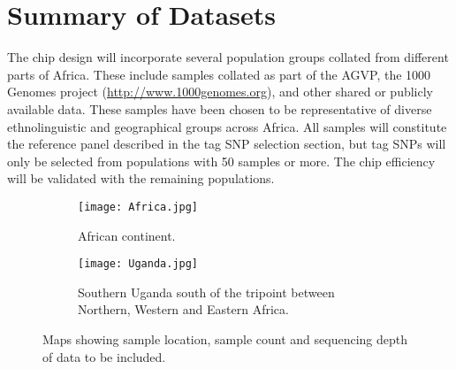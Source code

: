 \section{Summary of Datasets}
The chip design will incorporate several population groups collated from different parts of Africa. These include samples collated as part of the AGVP\cite{Gurdasani2015}, the 1000 Genomes project (\href{http://www.1000genomes.org}{http://www.1000genomes.org}),
 and other shared or publicly available data. These samples have been chosen to be representative of diverse ethnolinguistic and geographical groups across Africa. All samples will constitute the reference panel described in the tag SNP selection section, but tag SNPs will only be selected from populations with 50 samples or more. The chip efficiency will be validated with the remaining populations.

\begin{figure}[h]
\begin{subfigure}{.5\textwidth}
  \centering
  \texttt{[image: Africa.jpg]}
  \caption{African continent.}
\end{subfigure}%
\begin{subfigure}{.5\textwidth}
  \centering
  \texttt{[image: Uganda.jpg]}
  \caption{Southern Uganda south of the tripoint between Northern, Western and Eastern Africa.}
\end{subfigure}%
\caption{Maps showing sample location, sample count and sequencing depth of data to be included.}
\end{figure}

